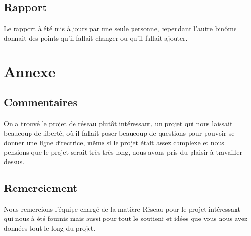 \documentclass[a4paper,titlepage]{report}
\begin{document}
\subsection{Rapport}
\paragraph{}
Le rapport à été mis à jours par une seule personne, cependant l'autre binôme donnait des points qu'il fallait changer ou qu'il fallait ajouter.





\section{Annexe}
\subsection{Commentaires}
\paragraph{}
On a trouvé le projet de réseau plutôt intéressant, un projet qui nous laissait beaucoup de liberté, où il fallait poser beaucoup de questions pour pouvoir se donner une ligne directrice, même si le projet était assez complexe et nous pensions que le projet serait très très long, nous avons pris du plaisir à travailler dessus.
\subsection{Remerciement}
\paragraph{}
Nous remercions l'équipe chargé de la matière Réseau pour le projet intéressant qui nous à été fournis mais aussi pour tout le soutient et idées que vous nous avez données tout le long du projet.
\end{document}
